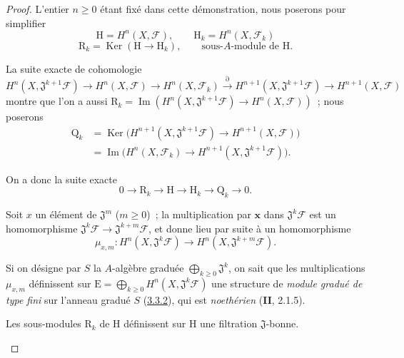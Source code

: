 \begin{proof}
L'entier $n\geq0$ étant fixé dans cette démonstration, nous poserons pour
simplifier
\[
\mathrm H=H^n(X,\mathcal F),\qquad
\mathrm H_k=H^n(X,\mathcal F_k)
\tag{4.1.7.3}\label{III.4.1.7.3-fr}
\]
\[
\mathrm R_k=\operatorname{Ker}(\mathrm H\longrightarrow\mathrm H_k),
\qquad\text{sous-$A$-module de $\mathrm H$.}
\tag{4.1.7.4}\label{III.4.1.7.4-fr}
\]

La suite exacte de cohomologie
\[
H^n(X,\mathfrak J^{k+1}\mathcal F)\longrightarrow H^n(X,\mathcal F)
\longrightarrow H^n(X,\mathcal F_k)\xrightarrow{\partial}
H^{n+1}(X,\mathfrak J^{k+1}\mathcal F)
\longrightarrow H^{n+1}(X,\mathcal F)
\]
montre que l'on a aussi
$\mathrm R_k=\operatorname{Im}(
H^n(X,\mathfrak J^{k+1}\mathcal F)\longrightarrow H^n(X,\mathcal F)
)$~;
nous poserons
\[
\begin{aligned}
\mathrm Q_k
&=\operatorname{Ker}\bigl(H^{n+1}(X,\mathfrak J^{k+1}\mathcal F)
\longrightarrow H^{n+1}(X,\mathcal F)\bigr)\\
&=\operatorname{Im}\bigl(H^n(X,\mathcal F_k)
\longrightarrow H^{n+1}(X,\mathfrak J^{k+1}\mathcal F)\bigr).
\end{aligned}
\tag{4.1.7.5}\label{III.4.1.7.5-fr}
\]

On a donc la suite exacte
\[
0\longrightarrow\mathrm R_k\longrightarrow\mathrm H
\longrightarrow\mathrm H_k\longrightarrow\mathrm Q_k\longrightarrow0.
\tag{4.1.7.6}\label{III.4.1.7.6-fr}
\]

\begin{env}[4.1.7.7]
\label{III.4.1.7.7-fr}
Soit $x$ un élément de $\mathfrak J^m$ ($m\geq0$)~; la multiplication par
$\boldsymbol{x}$ dans $\mathfrak J^k\mathcal F$ est un homomorphisme
$\mathfrak J^k\mathcal F\to\mathfrak J^{k+m}\mathcal F$, et donne lieu
par suite à un homomorphisme
\[
\mu_{x,m}:H^n(X,\mathfrak J^k\mathcal F)
\longrightarrow H^n(X,\mathfrak J^{k+m}\mathcal F).
\tag{4.1.7.8}\label{III.4.1.7.8-fr}
\]

Si on désigne par $S$ la $A$-algèbre graduée
$\bigoplus_{k\geq0}\mathfrak J^k$, on sait que les multiplications
$\mu_{x,m}$ définissent sur
$\mathrm E=\bigoplus_{k\geq0}H^n(X,\mathfrak J^k\mathcal F)$ une
structure de \emph{module gradué de type fini} sur l'anneau gradué $S$
(\hyperref[III.3.3.2-fr]{3.3.2}), qui est \emph{noethérien} (\textbf{II}, 2.1.5).
\end{env}

\begin{lemma}[4.1.7.9]
\label{III.4.1.7.9-fr}
Les sous-modules $\mathrm R_k$ de $\mathrm H$ définissent sur $\mathrm H$
une filtration $\mathfrak J$-bonne.
\end{lemma}


\end{proof}
